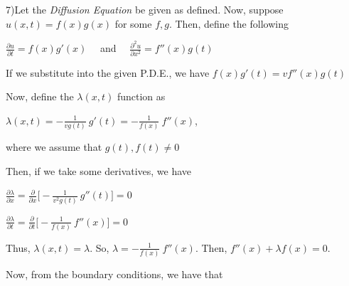 \documentclass[12pt, executivepaper]{article}
\begin{document}
\begin{flushleft}

7)Let the \textit{Diffusion Equation} be given as defined. Now, suppose $u(x,t)=f(x)g(x)$ for some $f,g$. Then, define the following

\begin{center}

$\frac{\partial u}{\partial t}=f(x)g'(x) \quad$ and  $\quad  \frac{\partial^2 u}{\partial x^2}=f''(x)g(t)$

\end{center}

If we substitute into the given P.D.E., we have $f(x)g'(t)=vf''(x)g(t)$

\vspace{2mm}

Now, define the $\lambda(x,t)$ function as

\begin{center}

$\lambda(x,t)=-\frac{1}{vg(t)} \ g'(t)=-\frac{1}{f(x)} \ f''(x)$, 

\vspace{2mm}

where we assume that $g(t), f(t) \neq 0$

\end{center}

Then, if we take some derivatives, we have

\pagebreak

\vspace*{-40mm}

\begin{center}

$\frac{\partial \lambda}{\partial x}=\frac{\partial}{\partial x} \bigg[-\frac{1}{v^2g(t)} \ g''(t)\bigg]=0$

\vspace{2mm}

$\frac{\partial \lambda}{\partial t}=\frac{\partial}{\partial t} \bigg[-\frac{1}{f(x)} \ f''(x)\bigg]=0$

\end{center}

Thus, $\lambda(x,t)=\lambda$. So, $\lambda=-\frac{1}{f(x)} \ f''(x)$. Then, $f''(x)+\lambda f(x)=0$.

\vspace{2mm}

Now, from the boundary conditions, we have that

\begin{center}


\end{center}
\end{flushleft}
\end{document}
